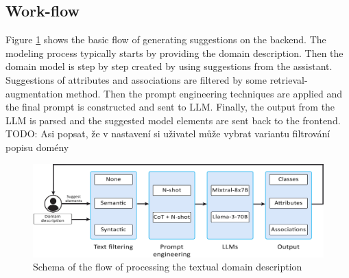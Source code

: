 \subsection{Work-flow}

Figure \ref{fig:work-flow} shows the basic flow of generating suggestions on the backend. The modeling process typically starts by providing the domain description. Then the domain model is step by step created by using suggestions from the assistant. Suggestions of attributes and associations are filtered by some retrieval-augmentation method. Then the prompt engineering techniques are applied and the final prompt is constructed and sent to LLM. Finally, the output from the LLM is parsed and the suggested model elements are sent back to the frontend. \\

TODO: Asi popsat, že v nastavení si uživatel může vybrat variantu filtrování popisu domény \\

\begin{figure}[!h]
    \centering
    \includegraphics[scale=0.23]{img/work-flow.jpg}
    \caption{\centering Schema of the flow of processing the textual domain description}
    \label{fig:work-flow}
\end{figure}
